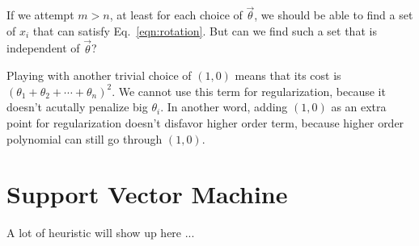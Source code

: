 If we attempt $m>n$, at least for each choice of $\vec\theta$, we should be able to find a set of $x_i$ that can satisfy Eq.~\ref{eqn:rotation}. But can we find such a set that is independent of $\vec\theta$?

Playing with another trivial choice of $(1, 0)$ means that its cost is $(\theta_1 + \theta_2 + \cdots + \theta_n)^2$. We cannot use this term for regularization, because it doesn't acutally penalize big $\theta_i$. In another word, adding $(1, 0)$ as an extra point for regularization doesn't disfavor higher order term, because higher order polynomial can still go through $(1,0)$.

\section{Support Vector Machine}
A lot of heuristic will show up here ...
